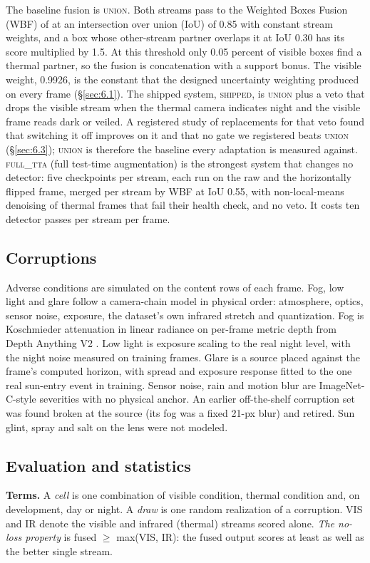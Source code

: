 \documentclass[10pt]{article}
\begin{document}
The baseline fusion is \textsc{union}. Both streams pass to the Weighted Boxes Fusion (WBF) of \citet{solovyev2021weighted} at an intersection over union (IoU) of 0.85 with constant stream weights, and a box whose other-stream partner overlaps it at IoU 0.30 has its score multiplied by 1.5. At this threshold only 0.05 percent of visible boxes find a thermal partner, so the fusion is concatenation with a support bonus. The visible weight, 0.9926, is the constant that the designed uncertainty weighting produced on every frame (\S\ref{sec:6.1}). The shipped system, \textsc{shipped}, is \textsc{union} plus a veto that drops the visible stream when the thermal camera indicates night and the visible frame reads dark or veiled. A registered study of replacements for that veto found that switching it off improves on it and that no gate we registered beats \textsc{union} (\S\ref{sec:6.3}); \textsc{union} is therefore the baseline every adaptation is measured against. \textsc{full\_tta} (full test-time augmentation) is the strongest system that changes no detector: five checkpoints per stream, each run on the raw and the horizontally flipped frame, merged per stream by WBF at IoU 0.55, with non-local-means denoising of thermal frames that fail their health check, and no veto. It costs ten detector passes per stream per frame.

\subsection{Corruptions}\label{sec:3.3}
Adverse conditions are simulated on the content rows of each frame. Fog, low light and glare follow a camera-chain model in physical order: atmosphere, optics, sensor noise, exposure, the dataset's own infrared stretch and quantization. Fog is Koschmieder attenuation in linear radiance on per-frame metric depth \citep{sakaridis2018semantic} from Depth Anything V2 \citep{yang2024depth}. Low light is exposure scaling to the real night level, with the night noise measured on training frames. Glare is a source placed against the frame's computed horizon, with spread and exposure response fitted to the one real sun-entry event in training. Sensor noise, rain and motion blur are ImageNet-C-style severities \citep{hendrycks2019benchmarking} with no physical anchor. An earlier off-the-shelf corruption set was found broken at the source (its fog was a fixed 21-px blur) and retired. Sun glint, spray and salt on the lens were not modeled.

\subsection{Evaluation and statistics}\label{sec:3.4}
\textbf{Terms.} A \emph{cell} is one combination of visible condition, thermal condition and, on development, day or night. A \emph{draw} is one random realization of a corruption. VIS and IR denote the visible and infrared (thermal) streams scored alone. \emph{The no-loss property} is fused $\geq$ max(VIS, IR): the fused output scores at least as well as the better single stream.
\end{document}
